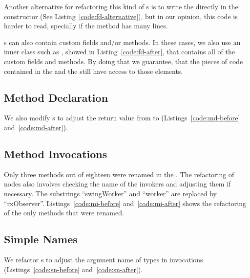 \documentclass[type=bsc,accentcolor=tud9c]{tudthesis}
\begin{document}


Another alternative for refactoring this kind of s is to write the  directly in the constructor (See Listing~\ref{code:fd-alternative}), but in our opinion, this code is harder to read, specially if the method  has many lines.



s can also contain custom fields and/or methods. In these cases, we also use an inner class such as , showed in Listing~\ref{code:fd-after}, that contains all of the custom fields and methods. By doing that we guarantee, that the pieces of code contained in the  and the  still have access to those elements.

\subsection{Method Declaration}
\label{sec:imp-methodDecl}
We also modify s to adjust the return value from  to  (Listings~\ref{code:md-before} and~\ref{code:md-after}).



\subsection{Method Invocations}
\label{sec:imp-methodInvocation}
Only three methods out of eighteen were renamed in the . The refactoring of  nodes also involves checking the name of the invokers and adjusting them if necessary. The substrings ``swingWorker'' and ``worker'' are replaced by ``rxObserver''. Listings~\ref{code:mi-before} and~\ref{code:mi-after} shows the refactoring of the only methods that were renamed.



\subsection{Simple Names}
\label{sec:imp-simpleName}
We refactor s to adjust the argument name of  types in invocations (Listings~\ref{code:sn-before} and~\ref{code:sn-after}).


\end{document}
